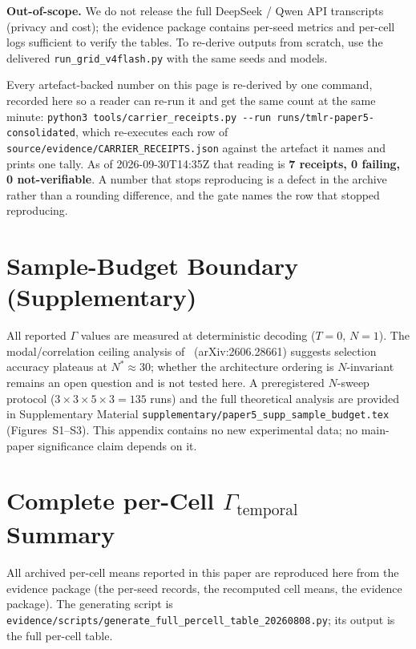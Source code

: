 \documentclass[11pt]{article}
\begin{document}
\noindent\textbf{Out-of-scope.}
We do not release the full DeepSeek / Qwen API transcripts (privacy and cost); the evidence package contains per-seed metrics and per-cell logs sufficient to verify the tables. To re-derive outputs from scratch, use the delivered \texttt{run\_grid\_v4flash.py} with the same seeds and models.


\appendix
Every artefact-backed number on this page is re-derived by one command, recorded here so a
reader can re-run it and get the same count at the same minute:
\texttt{python3 tools/carrier\_receipts.py -{}-run runs/tmlr-paper5-consolidated}, which re-executes
each row of \texttt{source/evidence/CARRIER\_RECEIPTS.json} against the artefact it names and prints one tally. As of
2026-09-30T14:35Z that reading is \textbf{7 receipts, 0 failing, 0 not-verifiable}.
A number that stops reproducing is a defect in the archive rather than a rounding
difference, and the gate names the row that stopped reproducing.
\section{Sample-Budget Boundary (Supplementary)}
\label{sec:supp-sample-budget}

All reported $\Gamma$ values are measured at deterministic decoding ($T{=}0$, $N{=}1$). The modal/correlation ceiling analysis of~\cite{bay2026sampling} (arXiv:2606.28661) suggests selection accuracy plateaus at $N^*{\approx}30$; whether the architecture ordering is $N$-invariant remains an open question and is not tested here. A preregistered $N$-sweep protocol ($3{\times}3{\times}5{\times}3{=}135$ runs) and the full theoretical analysis are provided in Supplementary Material \texttt{supplementary/paper5\_supp\_sample\_budget.tex} (Figures~S1--S3). This appendix contains no new experimental data; no main-paper significance claim depends on it.





\section{Complete per-Cell $\Gamma_{\text{temporal}}$ Summary}
\label{sec:supp-full-percell}
All archived per-cell means reported in this paper are reproduced here from the evidence package (the per-seed records, the recomputed cell means, the evidence package). The generating script is \texttt{evidence/scripts/generate\_full\_percell\_table\_20260808.py}; its output is the full per-cell table.
\end{document}
